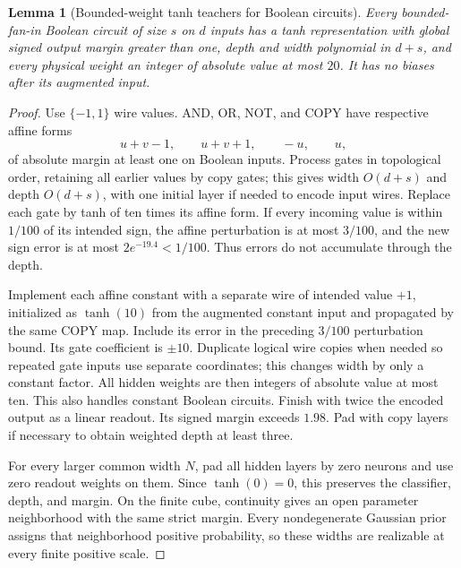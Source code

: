 \documentclass[11pt]{article}
\newtheorem{lemma}[theorem]{Lemma}
\theoremstyle{remark}
\begin{document}
\begin{lemma}[Bounded-weight tanh teachers for Boolean circuits]
\label{lem:boolean-teacher}
Every bounded-fan-in Boolean circuit of size $s$ on $d$ inputs has a
tanh representation with global signed output margin greater than
one, depth and width polynomial in $d+s$, and every physical weight
an integer of absolute value at most $20$. It has no biases after its augmented
input.
\end{lemma}
\begin{proof}
Use $\{-1,1\}$ wire values. AND, OR, NOT, and COPY have respective
affine forms
\[
 u+v-1,\qquad u+v+1,\qquad -u,\qquad u,
\]
of absolute margin at least one on Boolean inputs. Process gates in
topological order, retaining all earlier values by copy gates; this
gives width $O(d+s)$ and depth $O(d+s)$, with one initial layer if
needed to encode input wires. Replace each gate by tanh of ten times
its affine form. If every incoming value is within $1/100$ of its
intended sign, the affine perturbation is at most $3/100$, and the
new sign error is at most $2e^{-19.4}<1/100$. Thus errors do not
accumulate through the depth.

Implement each affine constant with a separate wire of intended
value $+1$, initialized as $\tanh(10)$ from the augmented constant
input and propagated by the same COPY map. Include its error in
the preceding $3/100$ perturbation bound. Its gate coefficient is
$\pm10$. Duplicate logical wire copies when needed so repeated
gate inputs use separate coordinates; this changes width by only
a constant factor. All hidden weights are then integers of
absolute value at most ten. This also handles constant Boolean
circuits. Finish with twice the encoded output as a linear
readout. Its signed margin exceeds $1.98$. Pad with copy layers if
necessary to obtain weighted depth at least three.

For every larger common width $N$, pad all hidden layers by zero
neurons and use zero readout weights on them. Since $\tanh(0)=0$,
this preserves the classifier, depth, and margin. On the finite
cube, continuity gives an open parameter neighborhood with the
same strict margin. Every nondegenerate Gaussian prior assigns
that neighborhood positive probability, so these widths are
realizable at every finite positive scale.
\end{proof}
\end{document}
